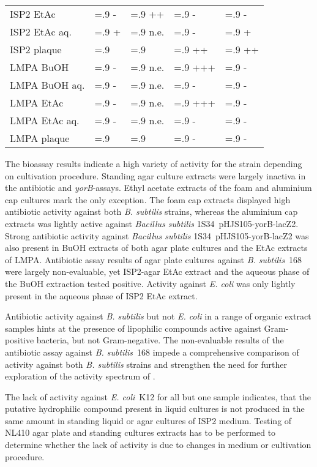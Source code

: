 \begin{table}[htbp]
\begin{tabularx}{\textwidth}{>{\hsize=1.4\hsize}X>{\hsize=.9\hsize}X>{\hsize=.9\hsize}X>{\hsize=.9\hsize}X>{\hsize=.9\hsize}X}
        ISP2 EtAc       & -     & ++    & -     & -    \\
        ISP2 EtAc aq.   & +     & n.e.  & -     & +    \\
        ISP2 plaque     &       &       & ++    & ++   \\
        \midrule
        LMPA BuOH       & -     & n.e.  & +++   & -    \\
        LMPA BuOH aq.   & -     & n.e.  & -     & -    \\
        LMPA EtAc       & -     & n.e.  & +++   & -    \\
        LMPA EtAc aq.   & -     & n.e.  & -     & -    \\
        LMPA plaque     &       &       & -     & -    \\
        \bottomrule
    \end{tabularx}
\end{table}

The bioassay results indicate a high variety of activity for the strain \tue{} depending on cultivation procedure.
Standing agar culture extracts were largely inactiva in the antibiotic and \emph{yorB}-assays.
Ethyl acetate extracts of the foam and aluminium cap cultures mark the only exception.
The foam cap extracts displayed high antibiotic activity against both \emph{B. subtilis} strains, whereas the aluminium cap extracts was lightly active against \textit{Bacillus subtilis} 1S34~pHJS105-yorB-lacZ2.
Strong antibiotic activity against \textit{Bacillus subtilis} 1S34~pHJS105-yorB-lacZ2 was also present in BuOH extracts of both agar plate cultures and the EtAc extracts of LMPA. 
Antibiotic assay results of agar plate cultures against \emph{B. subtilis}~168 were largely non-evaluable, yet ISP2-agar EtAc extract and the aqueous phase of the BuOH extraction tested positive.
Activity against \emph{E. coli} was only lightly present in the aqueous phase of ISP2 EtAc extract.

Antibiotic activity against \emph{B. subtilis} but not \emph{E. coli} in a range of organic extract samples hints at the presence of lipophilic compounds active against Gram-positive bacteria, but not Gram-negative.
The non-evaluable results of the antibiotic assay against \emph{B. subtilis}~168 impede a comprehensive comparison of activity against both \emph{B. subtilis} strains and strengthen the need for further exploration of the activity spectrum of \tue{}.

The lack of activity against \emph{E. coli}~K12 for all but one sample indicates, that the putative hydrophilic compound present in liquid cultures is not produced in the same amount in standing liquid or agar cultures of ISP2 medium.
Testing of NL410 agar plate and standing cultures extracts has to be performed to determine whether the lack of activity is due to changes in medium or cultivation procedure.

